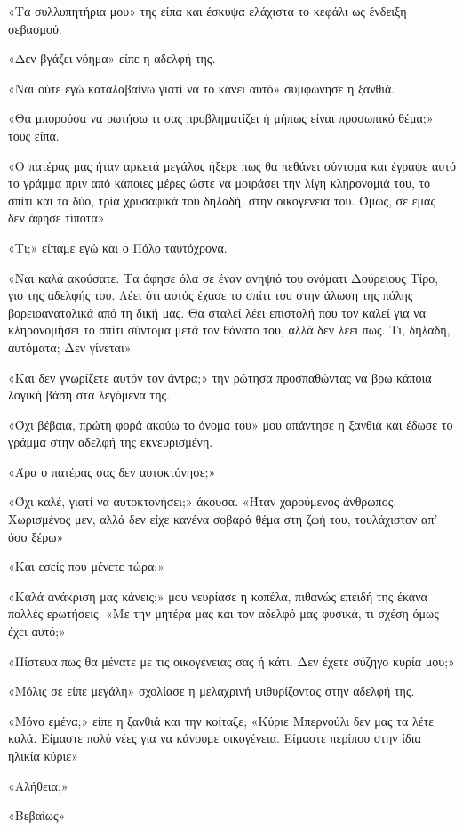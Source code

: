 \documentclass[12pt,twoside, openany]{book}
\begin{document}
«Τα συλλυπητήρια μου» της είπα και έσκυψα ελάχιστα το κεφάλι ως ένδειξη σεβασμού.

«Δεν βγάζει νόημα» είπε η αδελφή της.

«Ναι ούτε εγώ καταλαβαίνω γιατί να το κάνει αυτό» συμφώνησε η ξανθιά.

«Θα μπορούσα να ρωτήσω τι σας προβληματίζει ή μήπως είναι προσωπικό θέμα;» τους είπα.

«Ο πατέρας μας ήταν αρκετά μεγάλος ήξερε πως θα πεθάνει σύντομα και έγραψε αυτό το γράμμα πριν από κάποιες μέρες ώστε να μοιράσει την λίγη κληρονομιά του, το σπίτι και τα δύο, τρία χρυσαφικά του δηλαδή, στην οικογένεια του. Όμως, σε εμάς δεν άφησε τίποτα»

«Τι;» είπαμε εγώ και ο Πόλο ταυτόχρονα.

«Ναι καλά ακούσατε. Τα άφησε όλα σε έναν ανηψιό του ονόματι Δούρειους Τίρο, γιο της αδελφής του. Λέει ότι αυτός έχασε το σπίτι του στην άλωση της πόλης βορειοανατολικά από τη δική μας. Θα σταλεί λέει επιστολή που τον καλεί για να κληρονομήσει το σπίτι σύντομα μετά τον θάνατο του, αλλά δεν λέει πως. Τι, δηλαδή, αυτόματα; Δεν γίνεται»

«Και δεν γνωρίζετε αυτόν τον άντρα;» την ρώτησα προσπαθώντας να βρω κάποια λογική βάση στα λεγόμενα της. 

«Όχι βέβαια, πρώτη φορά ακούω το όνομα του» μου απάντησε η ξανθιά και έδωσε το γράμμα στην αδελφή της εκνευρισμένη.

«Άρα ο πατέρας σας δεν αυτοκτόνησε;» 

«Όχι καλέ, γιατί να αυτοκτονήσει;» άκουσα. «Ήταν χαρούμενος άνθρωπος. Χωρισμένος μεν, αλλά δεν είχε κανένα σοβαρό θέμα στη ζωή του, τουλάχιστον απ’ όσο ξέρω»

«Και εσείς που μένετε τώρα;»

«Καλά ανάκριση μας κάνεις;» μου νευρίασε η κοπέλα, πιθανώς επειδή της έκανα πολλές ερωτήσεις. «Με την μητέρα μας και τον αδελφό μας φυσικά, τι σχέση όμως έχει αυτό;»

«Πίστευα πως θα μένατε με τις οικογένειας σας ή κάτι. Δεν έχετε σύζηγο κυρία μου;»

«Μόλις σε είπε μεγάλη» σχολίασε η μελαχρινή ψιθυρίζοντας στην αδελφή της.

«Μόνο εμένα;» είπε η ξανθιά και την κοίταξε; «Κύριε Μπερνούλι δεν μας τα λέτε καλά. Είμαστε πολύ νέες για να κάνουμε οικογένεια. Είμαστε περίπου στην ίδια ηλικία κύριε»

«Αλήθεια;»

«Βεβαίως»
\end{document}
